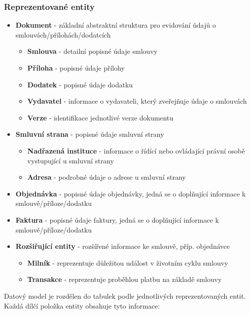 \subsubsection*{Reprezentované entity}

\begin{itemize}
\item \textbf{Dokument} - základní abstraktní struktura pro evidování údajů o smlouvách/přílohách/dodatcích
	\begin{itemize}
    \item \textbf{Smlouva} - detailní popisné údaje smlouvy
    \item \textbf{Příloha} - popisné údaje přílohy 
    \item \textbf{Dodatek} - popisné údaje dodatku
    \item \textbf{Vydavatel} - informace o vydavateli, který zveřejňuje údaje o smlouvách
    \item \textbf{Verze} - identifikace jednotlivé verze dokumentu 
	\end{itemize}
\item \textbf{Smluvní strana} - popisné údaje smluvní strany 
	\begin{itemize}
    \item \textbf{Nadřazená instituce} - informace o řídící nebo ovládající právní osobě vystupující u smluvní strany
    \item \textbf{Adresa} - podrobné údaje o adrese u smluvní strany 
	\end{itemize}
\item \textbf{Objednávka} - popisné údaje objednávky, jedná se o doplňující informace k smlouvě/příloze/dodatku
\item \textbf{Faktura} -  popisné údaje faktury, jedná se o doplňující informace k smlouvě/příloze/dodatku
\item \textbf{Rozšiřující entity} - rozšířené informace ke smlouvě, příp. objednávce
	\begin{itemize}
    \item \textbf{Milník} - reprezentuje důležitou událost v životním cyklu smlouvy
    \item \textbf{Transakce } - reprezentuje proběhlou platbu na základě smlouvy 
	\end{itemize}
\end{itemize}

Datový model je rozdělen do tabulek podle jednotlivých reprezentovaných entit. Každá dílčí položka entity obsahuje tyto informace:


